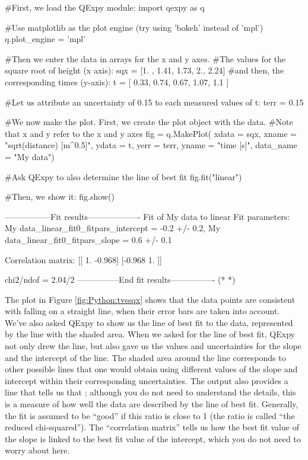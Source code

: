 \begin{python}[caption=Using QExPy to plot and fit linear data]
#First, we load the QExpy module:
import qexpy as q

#Use matplotlib as the plot engine (try using 'bokeh' instead of 'mpl')
q.plot_engine = 'mpl'

#Then we enter the data in arrays for the x and y axes.
#The values for the square root of height (x axis):
sqx = [1. , 1.41, 1.73, 2., 2.24]
#and then, the corresponding times (y-axis):
t = [ 0.33,  0.74,  0.67,  1.07,  1.1 ]

#Let us attribute an uncertainty of 0.15 to each measured values of t:
terr = 0.15

#We now make the plot. First, we create the plot object with the data.
#Note that x and y refer to the x and y axes
fig = q.MakePlot( xdata = sqx, xname = "sqrt(distance) [m^0.5]",
                  ydata = t, yerr = terr, yname = "time [s]",
                  data_name = "My data")
                  
#Ask QExpy to also determine the line of best fit                  
fig.fit("linear")
                  
#Then, we show it:
fig.show()          
\end{python}
\begin{poutput}
-----------------Fit results-------------------
Fit of  My data  to  linear
Fit parameters:
My data_linear_fit0_fitpars_intercept = -0.2 +/- 0.2,
My data_linear_fit0_fitpars_slope = 0.6 +/- 0.1

Correlation matrix: 
[[ 1.    -0.968]
 [-0.968  1.   ]]

chi2/ndof = 2.04/2
---------------End fit results----------------
(*  *)
\end{poutput}
The plot in Figure \ref{fig:Python:tvssqx} shows that the data points are consistent with falling on a straight line, when their error bars are taken into account. We've also asked QExpy to show us the line of best fit to the data, represented by the line with the shaded area. When we asked for the line of best fit, QExpy not only drew the line, but also gave us the values and uncertainties for the slope and the intercept of the line. The shaded area around the line corresponds to other possible lines that one would obtain using different values of the slope and intercept within their corresponding uncertainties. The output also provides a line that tells us that ; although you do not need to understand the details, this is a measure of how well the data are described by the line of best fit. Generally, the fit is assumed to be ``good'' if this ratio is close to 1 (the ratio is called ``the reduced chi-squared'').  The ``correlation matrix'' tells us how the best fit value of the slope is linked to the best fit value of the intercept, which you do not need to worry about here.


